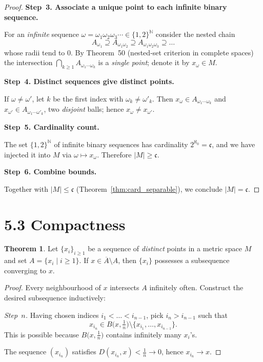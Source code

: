 \documentclass[12pt]{article}
\theoremstyle{definition} %
\newtheorem{theorem}{Theorem}
\theoremstyle{plain} %
\begin{document}
\begin{proof}
  \medskip
  \noindent\textbf{Step 3.  Associate a unique point to each infinite
  binary sequence.}

  For an \emph{infinite} sequence
  $\omega=\omega_1\omega_2\omega_3\cdots\in\{1,2\}^{\mathbb N}$
  consider the nested chain
  \[
      A_{\omega_1}\supseteq
      A_{\omega_1\omega_2}\supseteq
      A_{\omega_1\omega_2\omega_3}\supseteq\dots
  \]
  whose radii tend to $0$.  
  By Theorem 50 (nested‑set criterion in complete spaces) the
  intersection
  $\bigcap_{k\ge1}A_{\omega_1\cdots\omega_k}$ is a \emph{single point};
  denote it by $x_\omega\in M$.

  \medskip
  \noindent\textbf{Step 4.  Distinct sequences give distinct points.}

  If $\omega\ne\omega'$, let $k$ be the first index with
  $\omega_k\ne\omega'_k$.  
  Then $x_\omega\in A_{\omega_1\cdots\omega_k}$ and
  $x_{\omega'}\in A_{\omega_1\cdots\omega'_k}$, two \emph{disjoint}
  balls; hence $x_\omega\ne x_{\omega'}$.

  \medskip
  \noindent\textbf{Step 5.  Cardinality count.}

  The set $\{1,2\}^{\mathbb N}$ of infinite binary sequences has
  cardinality $2^{\aleph_0}=\mathfrak c$, and we have injected it into
  $M$ via $\omega\mapsto x_\omega$.  
  Therefore $\lvert M\rvert\ge\mathfrak c$.

  \medskip
  \noindent\textbf{Step 6.  Combine bounds.}

  Together with $\lvert M\rvert\le\mathfrak c$
  (Theorem~\ref{thm:card_separable}), we conclude
  $\lvert M\rvert=\mathfrak c$.
\end{proof}


\section*{5.3 \quad Compactness}
\begin{theorem}\label{thm:limit_subseq}
  Let $\{x_i\}_{i\ge 1}$ be a sequence of \emph{distinct} points in a
  metric space $M$ and set $A=\{x_i\mid i\ge1\}$.
  If $x\in\overline{A}\setminus A$, then $\{x_i\}$ possesses a
  subsequence converging to $x$.
\end{theorem}

\begin{proof}
  Every neighbourhood of $x$ intersects $A$ infinitely often.
  Construct the desired subsequence inductively:

  \smallskip
  \noindent
  \emph{Step $n$.}  
  Having chosen indices $i_1<\dots<i_{n-1}$, pick $i_n>i_{n-1}$
  such that
  \[
      x_{i_n}\in B\!\bigl(x,\tfrac1n\bigr)\setminus\{x_{i_1},\dots,x_{i_{n-1}}\}.
  \]
  This is possible because $B\!\bigl(x,\tfrac1n\bigr)$ contains
  infinitely many $x_i$’s.

  \smallskip
  The sequence $(x_{i_n})$ satisfies
  $D(x_{i_n},x)<\tfrac1n\to 0$, hence $x_{i_n}\to x$.
\end{proof}
\end{document}
